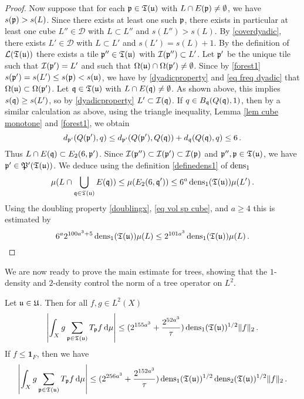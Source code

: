 \begin{proof}
    Now suppose that for each $\mathfrak p \in \mathfrak T(\mathfrak u)$ with $L \cap E(\mathfrak p) \ne \emptyset$, we have $s(\mathfrak p) > s(L)$. Since there exists at least one such $\mathfrak p$, there exists in particular at least one cube $L'' \in \mathcal{D}$ with $L \subset L''$ and $s(L'') > s(L)$. By \eqref{coverdyadic}, there exists $L' \in \mathcal{D}$ with $L \subset L'$ and $s(L') = s(L) + 1$. By the definition of $\mathcal{L}(\mathfrak T(\mathfrak u))$ there exists a tile $\mathfrak p'' \in \mathfrak T(\mathfrak u)$ with $\mathcal{I}(\mathfrak p'') \subset L'$. Let $\mathfrak p'$ be the unique tile such that $\mathcal{I}(\mathfrak p') = L'$ and such that $\Omega(\mathfrak u) \cap \Omega(\mathfrak p') \ne \emptyset$. Since by \eqref{forest1} $s(\mathfrak p') = s(L') \le s(\mathfrak p) < s(\mathfrak u)$, we have by \eqref{dyadicproperty} and \eqref{eq freq dyadic} that $\Omega(\mathfrak u) \subset \Omega(\mathfrak p')$. Let $\mathfrak q \in \mathfrak T(\mathfrak u)$ with $L \cap E(\mathfrak q) \ne \emptyset$. As shown above, this implies $s(\mathfrak q) \ge s(L')$, so by \eqref{dyadicproperty} $L' \subset \mathcal{I}(\mathfrak q)$. If $q \in B_{\mathfrak q}(Q(\mathfrak q), 1)$, then by a similar calculation as above, using the triangle inequality, Lemma \ref{lem cube monotone} and \eqref{forest1}, we obtain
    $$
        d_{\mathfrak p'}(Q(\mathfrak p'), q) \le d_{\mathfrak p'}(Q(\mathfrak p'), Q(\mathfrak q)) + d_{\mathfrak q}(Q(\mathfrak q), q) \le 6\,.
    $$
    Thus $L \cap E(\mathfrak q) \subset E_2(6, \mathfrak p')$. Since $\mathcal{I}(\mathfrak p'') \subset \mathcal{I}(\mathfrak p') \subset \mathcal{I}(\mathfrak p)$ and $\mathfrak p'', \mathfrak p \in \mathfrak T(\mathfrak u)$, we have $\mathfrak p' \in \mathfrak P'(\mathfrak T(\mathfrak u))$. We deduce using the definition \eqref{definedens1} of $\operatorname{\operatorname{dens}}_1$
    $$
        \mu(L \cap \bigcup_{\mathfrak q \in \mathfrak T(\mathfrak u)} E(\mathfrak q)) \le \mu(E_2(6, \mathfrak q')) \le 6^a \operatorname{\operatorname{dens}}_1(\mathfrak T(\mathfrak u)) \mu(L')\,.
    $$
    Using the doubling property \eqref{doublingx}, \eqref{eq vol sp cube}, and $a \ge 4$ this is estimated by
    $$
        6^a 2^{100a^3 + 5}\operatorname{\operatorname{dens}}_1(\mathfrak T(\mathfrak u)) \mu(L) \le 2^{101 a^3} \operatorname{\operatorname{dens}}_1(\mathfrak T(\mathfrak u))\mu(L)\,.
    $$
\end{proof}


We are now ready to prove the main estimate for trees, showing that the $1$-density and $2$-density control the norm of a tree operator on $L^2$.

\begin{cor}
    \label{cor tree est}
    Let $\mathfrak u \in \mathfrak U$. Then for all $f,g \in L^2(X)$   
    \begin{equation}
        \label{eq cor tree est}
        \left|\int_X g \sum_{\mathfrak p \in \mathfrak T(\mathfrak u)} T_{\mathfrak p }f \, \mathrm{d}\mu \right| \le (2^{155a^3} + \frac{2^{52a^3}}{\tau}) \operatorname{\operatorname{dens}}_1(\mathfrak T(\mathfrak u))^{1/2} \|f\|_2\,.
    \end{equation}
    If $f \le \mathbf{1}_F$, then we have
    \begin{equation}
        \label{eq cor tree est F}
        \left| \int_X g \sum_{\mathfrak p \in \mathfrak T(\mathfrak u)} T_{\mathfrak p }f\, \mathrm{d}\mu \right| \le (2^{256a^3} + \frac{2^{152a^3}}{\tau}) \operatorname{\operatorname{dens}}_1(\mathfrak T(\mathfrak u))^{1/2} \operatorname{\operatorname{dens}}_2(\mathfrak T(\mathfrak u))^{1/2} \|f\|_2\,.
    \end{equation}
\end{cor}

